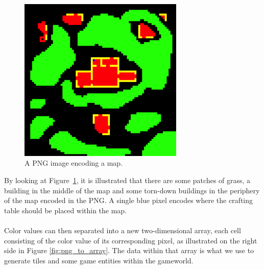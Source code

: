 \begin{figure}[H]
    \centering
    \includegraphics[width=0.7\textwidth]{figures/generating_levels/map.png}
    \caption{A PNG image encoding a map.}
    \label{fig:png_map}
\end{figure}
By looking at Figure~\ref{fig:png_map}, it is illustrated that there are some patches of grass, a building in the middle of the map and some torn-down buildings in the periphery of the map encoded in the PNG.
A single blue pixel encodes where the crafting table should be placed within the map.
\\\\
Color values can then separated into a new two-dimensional array, each cell consisting of the color value of its corresponding pixel, as illustrated on the right side in Figure \ref{fig:png_to_array}.
The data within that array is what we use to generate tiles and some game entities within the gameworld.
